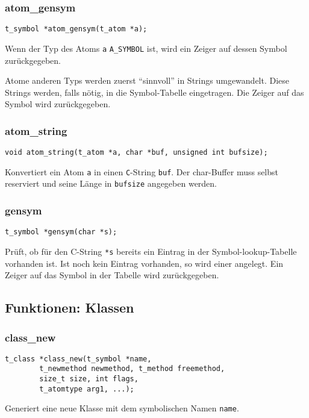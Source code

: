 \documentclass[12pt, a4paper,austrian, titlepage]{article}
\begin{document}
\begin{appendix}
\subsubsection{atom\_gensym}
\begin{verbatim}
t_symbol *atom_gensym(t_atom *a);
\end{verbatim}
Wenn der Typ des Atoms \verb+a+ \verb+A_SYMBOL+ ist, wird ein Zeiger
auf dessen Symbol zurückgegeben.

Atome anderen Typs werden zuerst ``sinnvoll'' in Strings umgewandelt.
Diese Strings werden, falls nötig, in die Symbol-Tabelle eingetragen.
Die Zeiger auf das Symbol wird zurückgegeben.


\subsubsection{atom\_string}
\begin{verbatim}
void atom_string(t_atom *a, char *buf, unsigned int bufsize);
\end{verbatim}
Konvertiert ein Atom \verb+a+ in einen {\tt C}-String \verb+buf+.
Der char-Buffer muss selbst reserviert und seine Länge in \verb+bufsize+ angegeben werden.

\subsubsection{gensym}
\begin{verbatim}
t_symbol *gensym(char *s);
\end{verbatim}
Prüft, ob für den C-String \verb+*s+ bereits ein Eintrag in der Symbol-lookup-Tabelle
vorhanden ist.
Ist noch kein Eintrag vorhanden, so wird einer angelegt.
Ein Zeiger auf das Symbol in der Tabelle wird zurückgegeben.


\subsection{Funktionen: Klassen}
\subsubsection{class\_new}
\begin{verbatim}
t_class *class_new(t_symbol *name,
        t_newmethod newmethod, t_method freemethod,
        size_t size, int flags,
        t_atomtype arg1, ...);
\end{verbatim}
Generiert eine neue Klasse mit dem symbolischen Namen \verb+name+.


\end{appendix}
\end{document}
